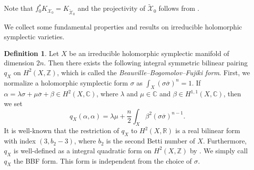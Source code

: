 \documentclass[12pt,twoside]{amsart}
\theoremstyle{definition}
\newtheorem{defn}[thm]{Definition}
\begin{document}
Note that $f_0^*K_{\mathcal{X}_0}=K_{\widetilde{\mathcal{X}}_0}$ and the projectivity of $\widetilde{\mathcal{X}}_0$ follows from \cite[Proposition 26.13]{GHJ}.

We collect some fundamental properties and results on irreducible holomorphic symplectic varieties.

\begin{defn}
    Let $X$ be an irreducible holomorphic symplectic manifold of dimension $2n$. Then there exists the following integral symmetric bilinear pairing $q_X$ on $H^2(X,\mathbb{Z})$, which is called the {\it Beauville--Bogomolov--Fujiki form}.
    First, we normalize a holomorphic symplectic form $\sigma$ as $\int_X(\sigma\overline{\sigma})^n=1$.
    If $\alpha=\lambda\sigma +\mu\overline{\sigma}+\beta\in H^{2}(X,\mathbb{C})$, where $\lambda$ and $\mu\in\mathbb{C}$ and $\beta\in H^{1,1}(X,\mathbb{C})$, then we set 
    \[
    q_X(\alpha,\alpha)=\lambda\mu+\frac{n}{2}\int_X\beta^2(\sigma\overline{\sigma})^{n-1}.
    \]
    It is well-known that the restriction of $q_X$ to $H^{2}(X,\mathbb{R})$ is a real bilinear form with index $(3,b_2-3)$, where $b_2$ is the second Betti number of $X$.  
    Furthermore, $q_X$ is well-defined as a integral quadratic form on $H^2(X,\mathbb{Z})$ by \cite[Th\'{e}or\`{e}me 5]{beauville}.
    We simply call $q_X$ the BBF form.
    This form is independent from the choice of $\sigma$.
\end{defn}
\end{document}
